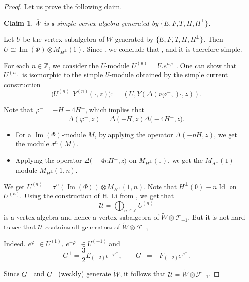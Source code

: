 \documentclass[11pt]{article}
\numberwithin{equation}{section}
\newcommand{\Z}{\mathbb Z}
\newcommand{\F}{\mathcal F}
\newtheorem{Claim}[Theorem]{Claim}
\begin{document}
\begin{proof}
Let us prove the following claim.
\begin{Claim}\label{Claim1}
 $ \overline W $ is a simple vertex algebra generated by $\big\{ E,F,T,H, H^{\perp} \big\}$.
\end{Claim}

Let $U$ be the vertex subalgebra of $\overline W $ generated by $ \big\{E,F,T,H, H^{\perp} \big\}$. Then $U \cong \operatorname{Im} (\Phi) \otimes M_{H^{\perp}} (1)$. Since , we conclude that
, and it is therefore simple.

 For each $n \in {\Z}$, we consider the $U$-module $U^{(n)} = U. e^{n \varphi^-}$. One can show that
 $ U^{(n)} $ is isomorphic to the simple $U$-module obtained by the simple current construction
\[
 \bigl(U^{(n)}, Y^{(n)} (\cdot, z)\bigr): = (U , Y(\Delta(n \varphi^-,) \cdot, z)).
 \]


 Note that $ \varphi^- = -H - 4 H^{\perp}$, which implies that
 \[%
 \Delta(\varphi^-, z) = \Delta( -H, z) \Delta\bigl(- 4 H^{\perp}, z\bigr).
 \]
 \begin{itemize}\itemsep=0pt
\item For a $ \operatorname{Im} (\Phi)$-module $M$, by applying the operator $\Delta(-nH, z)$, we get the module $\sigma^{n}( M)$.
\item Applying the operator $ \Delta\bigl( -4n H^{\perp}, z\bigr)$ on
 $ M_{H^{\perp}}(1)$, we get the $ M_{H^{\perp}}(1)$-module
$ M_{H^{\perp}} (1, n )$.
\end{itemize}

We get
$
U^{(n)}= \sigma^{n}( \operatorname{Im} (\Phi)) \otimes M_{H^{\perp}} (1,n )$.
Note that $ H^{\perp} (0) \equiv n \operatorname{Id} $ on $U^{(n)}$.
 Using the construction of H. Li from \cite{Li-ext}, we get that
\[%
 \mathcal U = \bigoplus_{n \in \mathbb{Z}} U^{(n)}
 \]
is a vertex algebra and hence a vertex subalgebra of $ \widetilde W \otimes \F_{-1}$. But it is not hard to see that $ \mathcal U$ contains all generators of $ \widetilde W \otimes \F_{-1}$.

 Indeed, $e^{\varphi^-}\in U^{(1)}$, $e^{-\varphi^-}\in U^{(-1)}$ and
 \[
 G^+ = \frac{3}{2} E_{(-2)}e^{-\varphi^-}, \qquad G^- =- F_{(-2)}e^{\varphi^-}.
 \]


Since $G^+$ and $G^-$ (weakly) generate $ \widetilde W$, it follows that
$
 \mathcal U = \widetilde W \otimes \F_{-1}$.







\end{proof}
\end{document}
